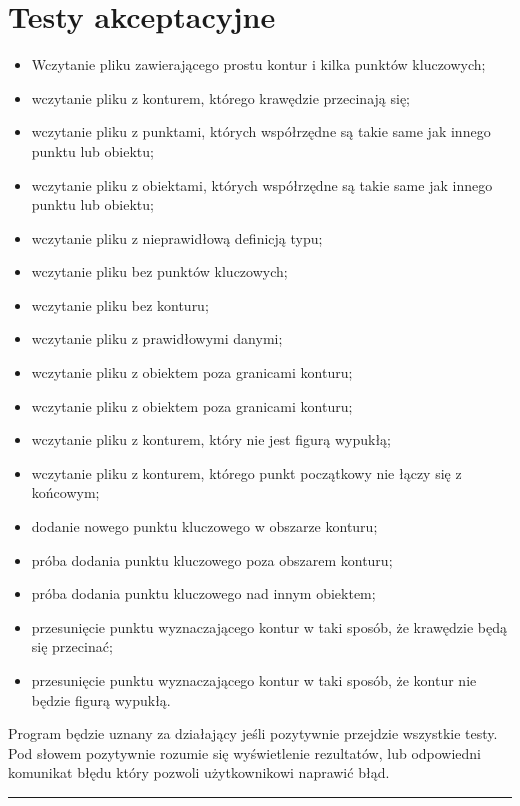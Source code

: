 \documentclass[a4paper,11pt]{article}
\newcommand{\linia}{\rule{\linewidth}{0.4mm}}
\begin{document}
\section{Testy akceptacyjne}
\begin{itemize}
\item Wczytanie pliku zawierającego prostu kontur i kilka punktów kluczowych;
\item wczytanie pliku z konturem, którego krawędzie przecinają się;
\item wczytanie pliku z punktami, których współrzędne są takie same jak innego punktu lub obiektu;
\item wczytanie pliku z obiektami, których współrzędne są takie same jak innego punktu lub obiektu;
\item wczytanie pliku z nieprawidłową definicją typu;
\item wczytanie pliku bez punktów kluczowych;
\item wczytanie pliku bez konturu;
\item wczytanie pliku z prawidłowymi danymi;
\item wczytanie pliku z obiektem poza granicami konturu;
\item wczytanie pliku z obiektem poza granicami konturu;
\item wczytanie pliku z konturem, który nie jest figurą wypukłą;
\item wczytanie pliku z konturem, którego punkt początkowy nie łączy się z końcowym;
\item dodanie nowego punktu kluczowego w obszarze konturu;
\item próba dodania punktu kluczowego poza obszarem konturu;
\item próba dodania punktu kluczowego nad innym obiektem;
\item przesunięcie punktu wyznaczającego kontur w taki sposób, że krawędzie będą się przecinać;
\item przesunięcie punktu wyznaczającego kontur w taki sposób, że kontur nie będzie figurą wypukłą.

\end{itemize}
Program będzie uznany za działający jeśli pozytywnie przejdzie wszystkie testy. Pod słowem pozytywnie rozumie się wyświetlenie rezultatów, lub odpowiedni komunikat błędu który pozwoli użytkownikowi naprawić błąd.
\noindent\linia
\end{document}
